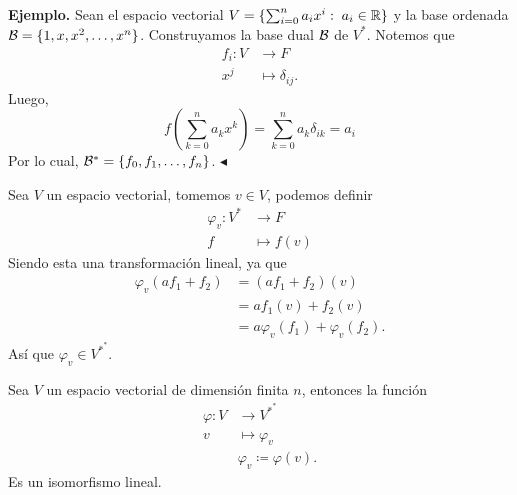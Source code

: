 \documentclass[12pt,a4paper]{book}
\newcommand{\llaves}[1]{\{#1\}}
\newcommand{\parentesis}[1]{\left(#1\right)}
\begin{document}
    \textbf{Ejemplo.} Sean el espacio vectorial $V = \llaves{\sum_{i = 0}^na_ix^{i}:\; a_i \in \R}$ y la base ordenada $\BB = \llaves{1, x, x^2, \dots, x^n}$. Construyamos la base dual $\mathcal{B}$ de $V^*$. Notemos que
    \begin{align*}
        f_i: V & \longrightarrow F\\
        x^j & \longmapsto \delta_{ij}.
    \end{align*}
    Luego,
    \[
    f\parentesis{\sum_{k = 0}^na_kx^k} = \sum_{k = 0}^{n}a_k\delta_{ik} = a_i
    \]
    Por lo cual, $\BB^* = \llaves{f_0, f_1, \dots, f_n}$. \hfill $\blacktriangleleft$

    Sea $V$ un espacio vectorial, tomemos $v \in V$, podemos definir
    \begin{align*}
        \varphi_v: V^* & \longrightarrow F\\
        f & \longmapsto f(v)
    \end{align*}
    Siendo esta una transformación lineal, ya que
    \begin{align*}
        \varphi_v(af_1 + f_2) & = (af_1 + f_2)(v)\\
        & = af_1(v) + f_2(v)\\
        & = a \varphi_v(f_1) + \varphi_v(f_2).
    \end{align*}
    Así que $\varphi_v \in V^{*^*}$.

    \begin{teorema}
        Sea $V$ un espacio vectorial de dimensión finita $n$, entonces la función
        \begin{align*}
            \varphi: V & \longrightarrow V^{*^*}\\
            v & \longmapsto \varphi_v\\[12pt]
            &\varphi_v \coloneqq \varphi(v).
        \end{align*}
        Es un isomorfismo lineal.
    \end{teorema}
    
\end{document}
